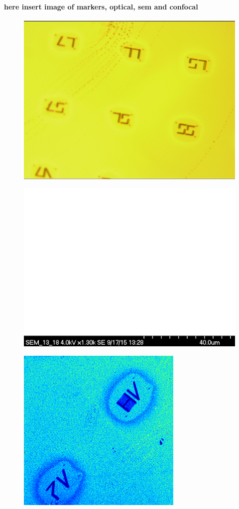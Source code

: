 \paragraph{here insert image of markers, optical, sem and confocal}
\FloatBarrier
\begin{figure}[h]
\centering
\includegraphics[width=0.7\linewidth]{Figures/pic/20150907_sample214_spincoated_5}
\caption{}
\label{fig:20150907sample214spincoated5}
\end{figure}
\FloatBarrier
\begin{figure}[h]
\centering
\includegraphics[width=0.7\linewidth]{Figures/pic/20150917-132834_sample214_49_q00}
\caption{}
\label{fig:20150917-132834sample21449q00}
\end{figure}
\FloatBarrier
\begin{figure}[h]
\centering
\includegraphics[width=0.7\linewidth]{Figures/pic/2015-09-16_12h06m53s_confocal_xy_image_from_raw}
\caption{}
\label{fig:20150907sample214spincoated5}
\end{figure}
\FloatBarrier


